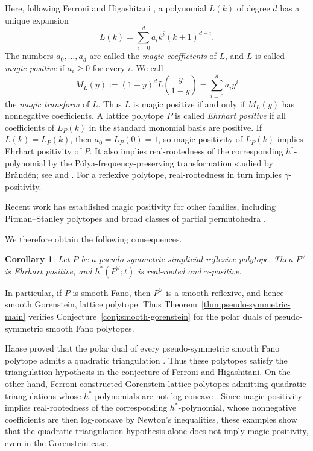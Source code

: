 \documentclass[10pt,a4paper]{amsart}
\newtheorem{Corollary}[Theorem]{Corollary}
\theoremstyle{definition}
\begin{document}
Here, following Ferroni and Higashitani
\cite[Section~4.5]{FerroniHigashitani}, a polynomial $L(k)$ of degree $d$ has a unique expansion
\[
L(k)=\sum_{i=0}^d a_i k^i(k+1)^{d-i}.
\]
The numbers $a_0,\ldots,a_d$ are called the \emph{magic coefficients}
of $L$, and $L$ is called \emph{magic positive} if $a_i\ge0$ for every $i$.
We call
\[
M_L(y)
:=
(1-y)^dL\left(\frac{y}{1-y}\right)
=
\sum_{i=0}^d a_i y^i
\]
the \emph{magic transform} of $L$.
Thus $L$ is magic positive if and only if $M_L(y)$ has nonnegative
coefficients.
A lattice polytope $P$ is called \emph{Ehrhart positive} if all
coefficients of $L_P(k)$ in the standard monomial basis are positive.
If $L(k)=L_P(k)$, then $a_0=L_P(0)=1$, so magic positivity of $L_P(k)$
implies Ehrhart positivity of $P$.  It also implies real-rootedness of the
corresponding $h^*$-polynomial by the P\'olya-frequency-preserving
transformation studied by Br\"and\'en; see
\cite{BrandenPF} and \cite[Theorem~4.19]{FerroniHigashitani}.  For a
reflexive polytope, real-rootedness in turn implies $\gamma$-positivity.

Recent work has established magic positivity for other families, including
Pitman--Stanley polytopes and broad classes of partial permutohedra
\cite{AvilaFerroniMorales,LiuZhangPartialPermutohedra}.

We therefore obtain the following consequences.

\begin{Corollary}\label{cor:fano-consequences}
Let $P$ be a pseudo-symmetric simplicial reflexive polytope.
Then $P^\vee$ is Ehrhart positive, and $h^*(P^\vee;t)$ is
real-rooted and $\gamma$-positive.
\end{Corollary}
In particular, if $P$ is smooth Fano, then $P^\vee$ is a smooth
reflexive, and hence smooth Gorenstein, lattice polytope.
Thus Theorem~\ref{thm:pseudo-symmetric-main} verifies
Conjecture~\ref{conj:smooth-gorenstein} for the polar duals of
pseudo-symmetric smooth Fano polytopes.

Haase proved that the polar dual of every pseudo-symmetric smooth Fano
polytope admits a quadratic triangulation
\cite[Corollaries~IV.2.6 and~IV.2.10]{HaaseThesis}.
Thus these polytopes satisfy the triangulation hypothesis in the
conjecture of Ferroni and Higashitani.
On the other hand, Ferroni constructed Gorenstein lattice polytopes
admitting quadratic triangulations whose $h^*$-polynomials are not
log-concave \cite[Theorem~1.4 and Section~6]{FerroniShenanigans}.
Since magic positivity implies real-rootedness of the corresponding
$h^*$-polynomial, whose nonnegative coefficients are then log-concave
by Newton's inequalities, these examples show that the
quadratic-triangulation hypothesis alone does not imply magic
positivity, even in the Gorenstein case.
\end{document}
